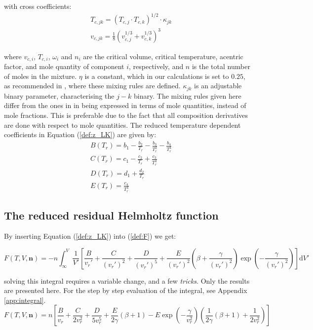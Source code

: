 \documentclass[english]{../thermomemo/thermomemo}
\numberwithin{equation}{section}
\newcommand*{\reff}[1]{(\ref{#1})}
\begin{document}
with cross coefficients:
\begin{align}
& T_{c,jk} = (T_{c,j} \cdot T_{c,k})^{1/2} \cdot \kappa_{jk} \\
& v_{c,jk} = \frac{1}{8}(v_{c,j}^{1/3} + v_{c,k}^{1/3})^3 
\end{align}

where $v_{c,i}$, $T_{c,i}$, $\omega_i$ and $n_i$ are the critical volume,  critical temperature, acentric factor, and mole quantity of component $i$, respectively, and $n$ is the total number of moles in the mixture. $\eta$ is a constant, which in our calculations is set to $0.25$, as recommended in \cite{PKP}, where these mixing rules are defined. $\kappa_{jk}$ is an adjustable binary parameter, characterising the $j-k$ binary. The mixing rules given here differ from the ones in \cite{PKP} in being expressed in terms of mole quantities, instead of mole fractions. This is preferable due to the fact that all composition derivatives are done with respect to mole quantities. The reduced temperature dependent coefficients in Equation \reff{def:z_LK} are given by:
\begin{align}
\label{eq:B}
& B(T_r) = b_1 - \frac{b_2}{T_r} - \frac{b_3}{T_r^2} - \frac{b_4}{T_r^3} \\
& C(T_r) = c_1 - \frac{c_2}{T_r} + \frac{c_3}{T_r^3} \\
& D(T_r) = d_1 + \frac{d_2}{T_r} \\
\label{eq:E}
& E(T_r) = \frac{c_4}{T_r^3} 
\end{align}

\subsection{The reduced residual Helmholtz function}
By inserting Equation \reff{def:z_LK} into \reff{def:F} we get:

\begin{equation}
F(T,V,\textbf{n}) = - n \int_\infty ^V \frac{1}{V'} \left[\frac{B}{v_r '} + \frac{C}{(v_r ') ^2 } + \frac{D}{(v_r ')^5} + \frac{E}{(v_r ')^2} \left( \beta + \frac{\gamma}{(v_r ')^2} \right) \exp{\left(-\frac{\gamma}{(v_r ')^2}\right)} \right] \mathrm{d}V'
\end{equation}

solving this integral requires a variable change, and a few \textit{tricks}. Only the results are presented here. For the step by step evaluation of the integral, see Appendix \ref{app:integral}. 
\begin{equation}
\label{def:F_LK}
F(T,V,\textbf{n}) = n\left[\frac{B}{v_r} + \frac{C}{2v_r^2} + \frac{D}{5v_r^5} + \frac{E}{2 \gamma} (\beta + 1) - E \exp \left(-\frac{\gamma}{v_r^2}\right) \left(\frac{1}{2\gamma} (\beta +1) + \frac{1}{2v_r^2}\right) \right]
\end{equation}
\end{document}
